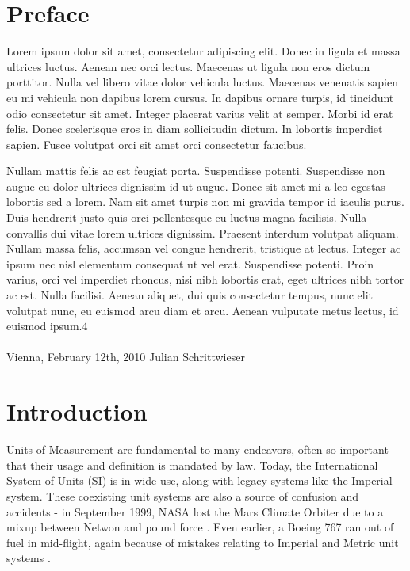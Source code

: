 \documentclass[12pt,oneside,a4paper]{scrbook}
\begin{document}
\chapter*{Preface}

Lorem ipsum dolor sit amet, consectetur adipiscing elit. Donec in ligula et massa ultrices luctus. Aenean nec orci lectus. Maecenas ut ligula non eros dictum porttitor. Nulla vel libero vitae dolor vehicula luctus. Maecenas venenatis sapien eu mi vehicula non dapibus lorem cursus. In dapibus ornare turpis, id tincidunt odio consectetur sit amet. Integer placerat varius velit at semper. Morbi id erat felis. Donec scelerisque eros in diam sollicitudin dictum. In lobortis imperdiet sapien. Fusce volutpat orci sit amet orci consectetur faucibus.

Nullam mattis felis ac est feugiat porta. Suspendisse potenti. Suspendisse non augue eu dolor ultrices dignissim id ut augue. Donec sit amet mi a leo egestas lobortis sed a lorem. Nam sit amet turpis non mi gravida tempor id iaculis purus. Duis hendrerit justo quis orci pellentesque eu luctus magna facilisis. Nulla convallis dui vitae lorem ultrices dignissim. Praesent interdum volutpat aliquam. Nullam massa felis, accumsan vel congue hendrerit, tristique at lectus. Integer ac ipsum nec nisl elementum consequat ut vel erat. Suspendisse potenti. Proin varius, orci vel imperdiet rhoncus, nisi nibh lobortis erat, eget ultrices nibh tortor ac est. Nulla facilisi. Aenean aliquet, dui quis consectetur tempus, nunc elit volutpat nunc, eu euismod arcu diam et arcu. Aenean vulputate metus lectus, id euismod ipsum.4
\\ \\
Vienna, February 12th, 2010  \hfill Julian Schrittwieser

\singlespacing
\tableofcontents

\chapter{Introduction}
\setcounter{page}{1}

Units of Measurement are fundamental to many endeavors, often so important that their usage and definition is mandated by law. Today, the International System of Units (SI) is in wide use, along with legacy systems like the Imperial system. These coexisting unit systems are also a source of confusion and accidents - in September 1999, NASA lost the Mars Climate Orbiter due to a mixup between Netwon and pound force \citep{Nasa99}. Even earlier, a Boeing 767 ran out of fuel in mid-flight, again because of mistakes relating to Imperial and Metric unit systems \citep{Witkin83}.
\end{document}
